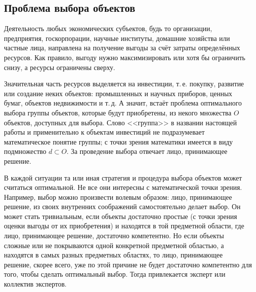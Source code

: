 
\subsection{Проблема выбора объектов}

Деятельность любых экономических субъектов, будь то организации, предприятия, госкорпорации, научные институты, домашние хозяйства или частные лица, направлена на получение выгоды за счёт затраты определённых ресурсов. Как правило, выгоду нужно максимизировать или хотя бы ограничить снизу, а ресурсы ограничены сверху. 

Значительная часть ресурсов выделяется на инвестиции, т.\,е. покупку, развитие или создание неких объектов: промышленных и научных приборов, ценных бумаг, объектов недвижимости и т.\,д. А значит, встаёт проблема оптимального выбора группы объектов, которые будут приобретены, из некого множества $O$ объектов, доступных для выбора. Слово <<группа>> в названии настоящей работы и применительно к объектам инвестиций не подразумевает  математическое понятие группы; с точки зрения математики имеется в виду подмножество $d \subset O$. За проведение выбора отвечает лицо, принимающее решение.

В каждой ситуации та или иная стратегия и процедура выбора объектов может считаться оптимальной. Не все они интересны с математической точки зрения. Например, выбор можно произвести волевым образом: лицо, принимающее решение, из своих внутренних соображений самостоятельно делает выбор. Он может стать тривиальным, если объекты достаточно простые (с точки зрения оценки выгоды от их приобретения) и находятся в той предметной области, где лицо, принимающее решение, достаточно компетентно. Но если объекты сложные или не покрываются одной конкретной предметной областью, а находятся в самых разных предметных областях, то лицо, принимающее решение, скорее всего, уже по этой причине не будет достаточно компетентно для того, чтобы сделать оптимальный выбор. Тогда привлекается эксперт или коллектив экспертов.

